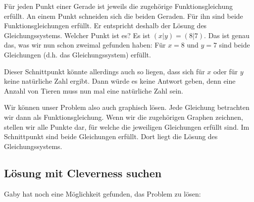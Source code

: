 \documentclass[%
11pt,%
twoside,%
titlepage,%
german,%
]{scrartcl}
\begin{document}
F\"ur jeden Punkt einer Gerade ist jeweils die zugeh\"orige Funktionsgleichung erf\"ullt. An einem Punkt schneiden sich die beiden Geraden. F\"ur ihn sind beide Funktionsgleichungen erf\"ullt. Er entspricht deshalb der L\"osung des Gleichungssystems. Welcher Punkt ist es? Es ist $(x|y)=(8|7)$. Das ist genau das, was wir nun schon zweimal gefunden haben: F\"ur $x=8$ und $y=7$ sind beide Gleichungen (d.h. das Gleichungssystem) erf\"ullt.

Dieser Schnittpunkt k\"onnte allerdings auch so liegen, dass sich f\"ur $x$ oder f\"ur $y$ keine nat\"urliche Zahl ergibt. Dann w\"urde es keine Antwort geben, denn eine Anzahl von Tieren muss nun mal eine nat\"urliche Zahl sein.

Wir k\"onnen unser Problem also auch graphisch l\"osen. Jede Gleichung betrachten wir dann als Funktionsgleichung. Wenn wir die zugeh\"origen Graphen zeichnen, stellen wir alle Punkte dar, f\"ur welche die jeweiligen Gleichungen erf\"ullt sind. Im Schnittpunkt sind beide Gleichungen erf\"ullt. Dort liegt die L\"osung des Gleichungssystems.


\subsection{Lösung mit Cleverness suchen}
\label{linglsyst:raffiniert}

Gaby hat noch eine M\"oglichkeit gefunden, das Problem zu l\"osen:
\end{document}
